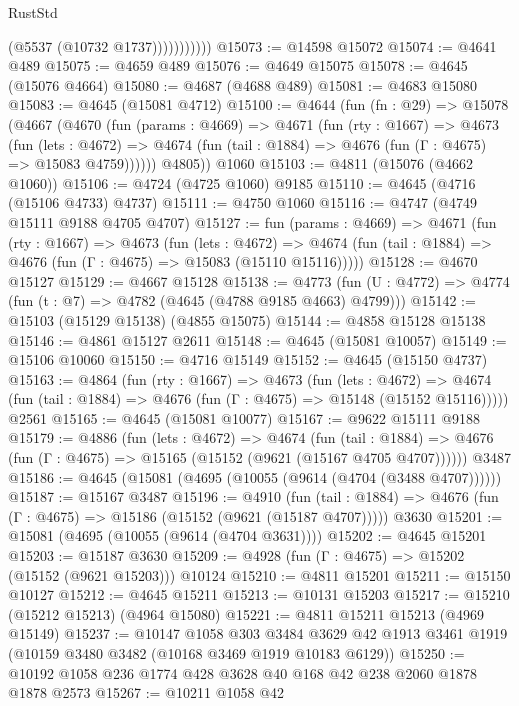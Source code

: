 \begin{lexlean}{RustStd}
\begin{coremodule}
                      (@5537 (@10732 @1737)))))))))))
@15073 := @14598 @15072
@15074 := @4641 @489
@15075 := @4659 @489
@15076 := @4649 @15075
@15078 := @4645 (@15076 @4664)
@15080 := @4687 (@4688 @489)
@15081 := @4683 @15080
@15083 := @4645 (@15081 @4712)
@15100 := @4644
    (fun (fn : @29) =>
    @15078
      (@4667
        (@4670
          (fun (params : @4669) =>
          @4671
            (fun (rty : @1667) =>
            @4673
              (fun (lets : @4672) =>
              @4674 (fun (tail : @1884) => @4676 (fun (Γ : @4675) => @15083 @4759))))))
        @4805))
    @1060
@15103 := @4811 (@15076 (@4662 @1060))
@15106 := @4724 (@4725 @1060) @9185
@15110 := @4645 (@4716 (@15106 @4733) @4737)
@15111 := @4750 @1060
@15116 := @4747 (@4749 @15111 @9188 @4705 @4707)
@15127 := fun (params : @4669) =>
  @4671
    (fun (rty : @1667) =>
    @4673
      (fun (lets : @4672) =>
      @4674 (fun (tail : @1884) => @4676 (fun (Γ : @4675) => @15083 (@15110 @15116)))))
@15128 := @4670 @15127
@15129 := @4667 @15128
@15138 := @4773 (fun (U : @4772) => @4774 (fun (t : @7) => @4782 (@4645 (@4788 @9185 @4663) @4799)))
@15142 := @15103 (@15129 @15138) (@4855 @15075)
@15144 := @4858 @15128 @15138
@15146 := @4861 @15127 @2611
@15148 := @4645 (@15081 @10057)
@15149 := @15106 @10060
@15150 := @4716 @15149
@15152 := @4645 (@15150 @4737)
@15163 := @4864
    (fun (rty : @1667) =>
    @4673
      (fun (lets : @4672) =>
      @4674 (fun (tail : @1884) => @4676 (fun (Γ : @4675) => @15148 (@15152 @15116)))))
    @2561
@15165 := @4645 (@15081 @10077)
@15167 := @9622 @15111 @9188
@15179 := @4886
    (fun (lets : @4672) =>
    @4674
      (fun (tail : @1884) =>
      @4676 (fun (Γ : @4675) => @15165 (@15152 (@9621 (@15167 @4705 @4707))))))
    @3487
@15186 := @4645 (@15081 (@4695 (@10055 (@9614 (@4704 (@3488 @4707))))))
@15187 := @15167 @3487
@15196 := @4910
    (fun (tail : @1884) => @4676 (fun (Γ : @4675) => @15186 (@15152 (@9621 (@15187 @4707)))))
    @3630
@15201 := @15081 (@4695 (@10055 (@9614 (@4704 @3631))))
@15202 := @4645 @15201
@15203 := @15187 @3630
@15209 := @4928 (fun (Γ : @4675) => @15202 (@15152 (@9621 @15203))) @10124
@15210 := @4811 @15201
@15211 := @15150 @10127
@15212 := @4645 @15211
@15213 := @10131 @15203
@15217 := @15210 (@15212 @15213) (@4964 @15080)
@15221 := @4811 @15211 @15213 (@4969 @15149)
@15237 := @10147
    @1058
    @303
    @3484
    @3629
    @42
    @1913
    @3461
    @1919
    (@10159 @3480 @3482 (@10168 @3469 @1919 @10183 @6129))
@15250 := @10192 @1058 @236 @1774 @428 @3628 @40 @168 @42 @238 @2060 @1878 @1878 @2573
@15267 := @10211
    @1058
    @42

\end{coremodule}
\end{lexlean}
